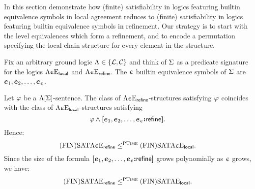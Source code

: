 
In this section demonstrate how (finite) satisfiability in logics featuring
builtin equivalence symbols in local agreement reduces to (finite)
satisfiability in logics featuring builtin equivalence symbols in refinement.
Our strategy is to start with the level equivalences which form a refinement,
and to encode a permutation specifying the local chain structure for every
element in the structure.

Fix an arbitrary ground logic $\Lambda \in \left\{\mathcal{L}, \mathcal{C}\right\}$ and think of $\mathrm{\Sigma}$ as
a predicate signature for the logics $\Lambda{\upepsilon}\mathrm{E}_{\mathsf{local}}$ and
$\Lambda{\upepsilon}\mathrm{E}_{\mathsf{refine}}$. The $\upepsilon$ builtin equivalence symbols of $\mathrm{\Sigma}$ are
$\bm{e}_{1}, \bm{e}_{2}, \dots, \bm{e}_{\upepsilon}$.

Let $\varphi$ be a $\Lambda[\mathrm{\Sigma}]$-sentence.
The class of $\Lambda{\upepsilon}\mathrm{E}_{\mathsf{refine}}$-structures satisfying $\varphi$ coincides with
the class of $\Lambda{\upepsilon}\mathrm{E}_{\mathsf{local}}$-structures satisfying
\[
  \varphi \land {\bm{[}\bm{e}_{1},\bm{e}_{2},\dots,\bm{e}_{\upepsilon}\mathord{\bm{:}}\mathsf{refine}\bm{]}}.
\] 
Hence:
\[
  \mathrm{(FIN)SAT}\Lambda{\upepsilon}\mathrm{E}_{\mathsf{refine}} \leq^{\text{\normalfont{\scshape PTime}}} \mathrm{(FIN)SAT}\Lambda{\upepsilon}\mathrm{E}_{\mathsf{local}}.
\]
Since the size of the formula ${\bm{[}\bm{e}_{1},\bm{e}_{2},\dots,\bm{e}_{\upepsilon}\mathord{\bm{:}}\mathsf{refine}\bm{]}}$ grows 
polynomially as $\upepsilon$ grows, we have:
\[
  \mathrm{(FIN)SAT}\Lambda{{}}\mathrm{E}_{\mathsf{refine}} \leq^{\text{\normalfont{\scshape PTime}}} \mathrm{(FIN)SAT}\Lambda{{}}\mathrm{E}_{\mathsf{local}}.
\]

